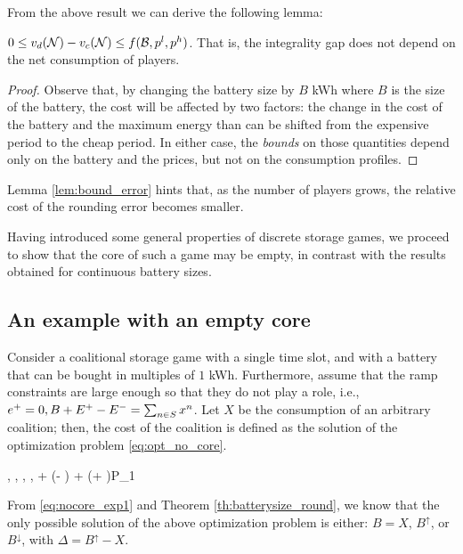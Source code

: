 From the above result we can derive the following lemma:

\begin{lemma}\label{lem:bound_error}
$ 0 \leq v_d(\mathcal{N}) - v_c(\mathcal{N}) \leq f(\mathcal{B}, p^l, p^h)$. That is, the integrality gap does not depend on the net consumption of players.
\end{lemma}

\begin{proof}
Observe that, by changing the battery size by $B$ kWh where $B$ is the size of the battery, the cost will be affected by two factors: the change in the cost of the battery and the maximum energy than can be shifted from the expensive period to the cheap period. In either case, the \emph{bounds} on those quantities depend only on the battery and the prices, but not on the consumption profiles.
\end{proof}

Lemma \ref{lem:bound_error} hints that, as the number of players grows, the relative cost of the rounding error becomes smaller.

Having introduced some general properties of discrete storage games, we proceed to show that the core of such a game may be empty, in contrast with the results obtained for continuous battery sizes.

\subsection{An example with an empty core}\label{sec:empty_core}

Consider a coalitional storage game with a single time slot, and with a battery that can be bought in multiples of $1$ kWh. Furthermore, assume that the ramp constraints are large enough so that they do not play a role, i.e., $e^+ = 0, B + E^+ - E^- = \sum_{n \in S} x^n$.
Let $X$ be the consumption of an arbitrary coalition; then, the cost of the coalition is defined as the solution of the optimization problem \eqref{eq:opt_no_core}.
\begin{mini!}[4]
{\bat, \Ep, \Ene, \ep, \ene}{ \bat + \pricelow(\bat - \Ene) +  \pricehigh(\Ep + \ep)}{}{P_1}\label{eq:opt_no_core}
\end{mini!}

From \eqref{eq:nocore_exp1} and Theorem \ref{th:batterysize_round}, we know that the only possible solution of the above optimization problem is either: $B = X$, $B^{\uparrow}$, or $B^{\downarrow}$, with $\Delta = B^{\uparrow} - X$.

